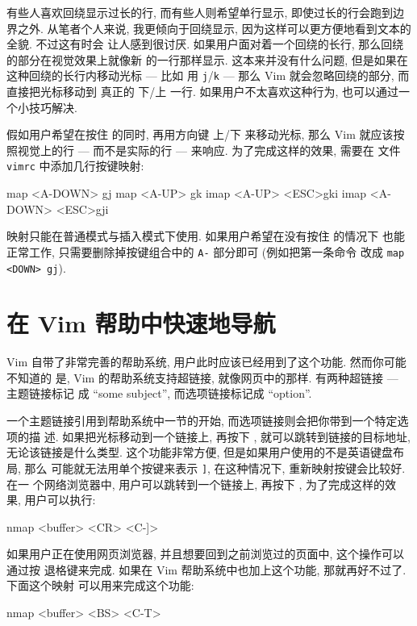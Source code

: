 有些人喜欢回绕显示过长的行, 而有些人则希望单行显示, 即使过长的行会跑到边界之外.
从笔者个人来说, 我更倾向于回绕显示, 因为这样可以更方便地看到文本的全貌. 不过这有时会
让人感到很讨厌. 如果用户面对着一个回绕的长行, 那么回绕的部分在视觉效果上就像新
的一行那样显示. 这本来并没有什么问题, 但是如果在这种回绕的长行内移动光标 --- 比如
用 \texttt{j}/\texttt{k} --- 那么 Vim 就会忽略回绕的部分, 而直接把光标移动到
真正的 下/上 一行. 如果用户不太喜欢这种行为, 也可以通过一个小技巧解决.

假如用户希望在按住  的同时, 再用方向键 上/下 来移动光标, 那么 Vim
就应该按照视觉上的行 --- 而不是实际的行 --- 来响应. 为了完成这样的效果, 需要在
文件 \texttt{vimrc} 中添加几行按键映射:
\begin{vimcode}
map <A-DOWN> gj
map <A-UP> gk
imap <A-UP> <ESC>gki
imap <A-DOWN> <ESC>gji
\end{vimcode}

映射只能在普通模式与插入模式下使用. 如果用户希望在没有按住  的情况下
也能正常工作, 只需要删除掉按键组合中的 \texttt{A-} 部分即可 (例如把第一条命令
改成 \texttt{map <DOWN> gj}).

\section{在 Vim 帮助中快速地导航}
\label{sec:faster_navigation_in_vim_help}

Vim 自带了非常完善的帮助系统, 用户此时应该已经用到了这个功能. 然而你可能不知道的
是, Vim 的帮助系统支持超链接, 就像网页中的那样. 有两种超链接 --- 主题链接标记
成 ``some subject'', 而选项链接标记成 ``option''.

一个主题链接引用到帮助系统中一节的开始, 而选项链接则会把你带到一个特定选项的描
述. 如果把光标移动到一个链接上, 再按下 \key{Ctrl+]}, 就可以跳转到链接的目标地址,
无论该链接是什么类型. 这个功能非常方便, 但是如果用户使用的不是英语键盘布局, 那么
可能就无法用单个按键来表示 \texttt{]}, 在这种情况下, 重新映射按键会比较好. 在一
个网络浏览器中, 用户可以跳转到一个链接上, 再按下 , 为了完成这样的效
果, 用户可以执行:
\begin{vimcode}
nmap <buffer> <CR> <C-]>
\end{vimcode}

如果用户正在使用网页浏览器, 并且想要回到之前浏览过的页面中, 这个操作可以通过按
退格键来完成. 如果在 Vim 帮助系统中也加上这个功能, 那就再好不过了. 下面这个映射
可以用来完成这个功能:
\begin{vimcode}
nmap <buffer> <BS> <C-T>
\end{vimcode}

